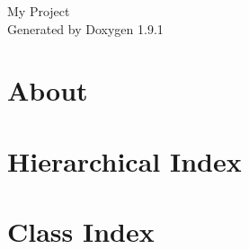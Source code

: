 \let\mypdfximage\pdfximage\def\pdfximage{\immediate\mypdfximage}\documentclass[twoside]{book}
\newcommand{\+}{\discretionary{\mbox{\scriptsize$\hookleftarrow$}}{}{}}
\newcommand{\clearemptydoublepage}{%
  \newpage{\pagestyle{empty}\cleardoublepage}%
}
\begin{document}
\raggedbottom

\hypersetup{pageanchor=false,
             bookmarksnumbered=true,
             pdfencoding=unicode
            }
\begin{titlepage}
\vspace*{7cm}
\begin{center}%
{\Large My Project }\\
\vspace*{1cm}
{\large Generated by Doxygen 1.9.1}\\
\end{center}
\end{titlepage}
\clearemptydoublepage
{}
\tableofcontents
\clearemptydoublepage
{}
\hypersetup{pageanchor=true}

\chapter{About}
\label{index}\hypertarget{index}{}
\chapter{Hierarchical Index}

\chapter{Class Index}

\end{document}
